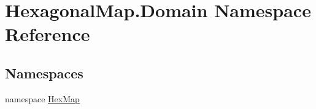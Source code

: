 \hypertarget{namespace_hexagonal_map_1_1_domain}{}\section{Hexagonal\+Map.\+Domain Namespace Reference}
\label{namespace_hexagonal_map_1_1_domain}
\subsection*{Namespaces}
\begin{DoxyCompactItemize}
\item 
namespace \mbox{\hyperlink{namespace_hexagonal_map_1_1_domain_1_1_hex_map}{Hex\+Map}}
\end{DoxyCompactItemize}
